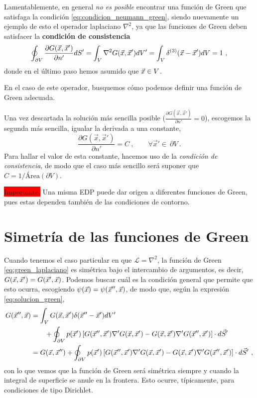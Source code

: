 Lamentablemente, en general \emph{no es posible} encontrar una función de Green que satisfaga la condición \eqref{eq:condicion_neumann_green}, siendo nuevamente un ejemplo de esto el operador laplaciano $\nabla^2$, ya que las funciones de Green deben satisfacer la \textbf{condición de consistencia}
\begin{equation}
    \oint_{\partial V} \frac{\partial G(\vec{x}, \vec{x}')}{\partial n'} dS' = \int_V \nabla^2 G(\vec{x},\vec{x}') dV' = \int_V \delta^{(3)}(\vec{x} - \vec{x}') dV = 1 \ ,
\end{equation}
donde en el último paso hemos asumido que $\vec{x} \in V$. 

En el caso de este operador, busquemos cómo podemos definir una función de Green adecuada.

Una vez descartada la solución más sencilla posible ($\frac{\partial G(\vec{x}, \vec{x}')}{\partial n'} = 0$), escogemos la segunda más sencilla, igualar la derivada a una constante,
\begin{equation}
    \frac{\partial G(\vec{x}, \vec{x}')}{\partial n'} = C \ , \qquad \forall \vec{x}' \in \ \partial V \ .
\end{equation}
Para hallar el valor de esta constante, hacemos uso de la \emph{condición de consistencia}, de modo que el caso más sencillo será suponer que $C = 1/\text{Área}(\partial V)$.


\colorbox{red}{Importante.} Una misma EDP puede dar origen a diferentes funciones de Green, pues estas dependen también de las condiciones de contorno.

\section{Simetría de las funciones de Green}

Cuando tenemos el caso particular en que $\mathcal{L} = \nabla^2$, la función de Green \eqref{eq:green_laplaciano} es simétrica bajo el intercambio de argumentos, es decir, $G(\vec{x}, \vec{x}') = G(\vec{x}', \vec{x})$. Podemos buscar cuál es la condición general que permite que esto ocurra, escogiendo $\psi(\vec{x}) = \psi(\vec{x}'', \vec{x})$, de modo que, según la expresión \eqref{eq:solucion_green},
\begin{align}
    \nonumber G(\vec{x}'', \vec{x}) & = \int_V G(\vec{x}, \vec{x}') \delta(\vec{x}'' - \vec{x}') dV' \\ 
    & \qquad + \oint_{\partial V} p(\vec{x}')\left[ G(\vec{x}'', \vec{x}') \nabla' G(\vec{x}, \vec{x}') - G(\vec{x}, \vec{x}') \nabla'G(\vec{x}'', \vec{x}') \right] \cdot d\vec{S}' \\
    & = G(\vec{x}, \vec{x}'') + \oint_{\partial V} p(\vec{x}')\left[ G(\vec{x}'', \vec{x}') \nabla' G(\vec{x}, \vec{x}') - G(\vec{x}, \vec{x}') \nabla'G(\vec{x}'', \vec{x}') \right] \cdot d\vec{S}' \ ,
\end{align}
con lo que vemos que la función de Green será simétrica siempre y cuando la integral de superficie se anule en la frontera. Esto ocurre, típicamente, para condiciones de tipo Dirichlet.

